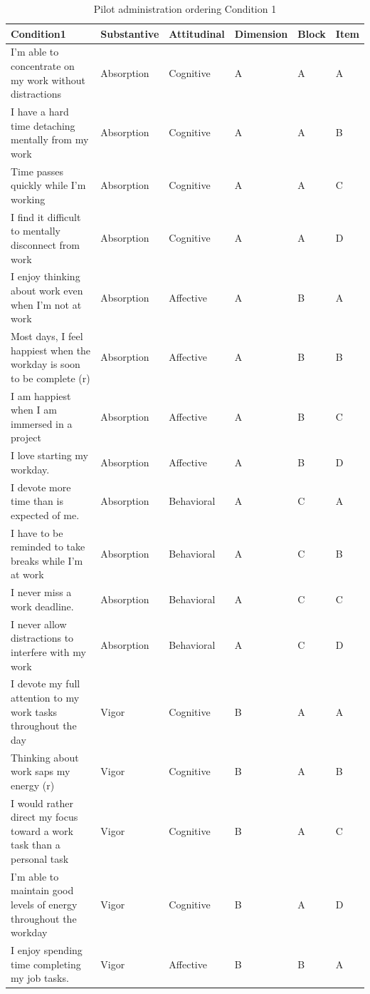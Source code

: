 \documentclass[
]{book}
\begin{document}
\begin{table}

\caption{\label{tab:conditions}Pilot administration ordering Condition 1}
\centering
\begin{tabular}[t]{l|l|l|l|l|l}
\hline
Condition1 & Substantive & Attitudinal & Dimension & Block & Item\\
\hline
I’m able to concentrate on my work without distractions & Absorption & Cognitive & A & A & A\\
\hline
I have a hard time detaching mentally from my work & Absorption & Cognitive & A & A & B\\
\hline
Time passes quickly while I’m working & Absorption & Cognitive & A & A & C\\
\hline
I find it difficult to mentally disconnect from work & Absorption & Cognitive & A & A & D\\
\hline
I enjoy thinking about work even when I’m not at work & Absorption & Affective & A & B & A\\
\hline
Most days, I feel happiest when the workday is soon to be complete (r) & Absorption & Affective & A & B & B\\
\hline
I am happiest when I am immersed in a project & Absorption & Affective & A & B & C\\
\hline
I love starting my workday. & Absorption & Affective & A & B & D\\
\hline
I devote more time than is expected of me. & Absorption & Behavioral & A & C & A\\
\hline
I have to be reminded to take breaks while I’m at work & Absorption & Behavioral & A & C & B\\
\hline
I never miss a work deadline. & Absorption & Behavioral & A & C & C\\
\hline
I never allow distractions to interfere with my work & Absorption & Behavioral & A & C & D\\
\hline
I devote my full attention to my work tasks throughout the day & Vigor & Cognitive & B & A & A\\
\hline
Thinking about work saps my energy (r) & Vigor & Cognitive & B & A & B\\
\hline
I would rather direct my focus toward a work task than a personal task & Vigor & Cognitive & B & A & C\\
\hline
I’m able to maintain good levels of energy throughout the workday & Vigor & Cognitive & B & A & D\\
\hline
I enjoy spending time completing my job tasks. & Vigor & Affective & B & B & A\\

\end{tabular}
\end{table}
\end{document}

